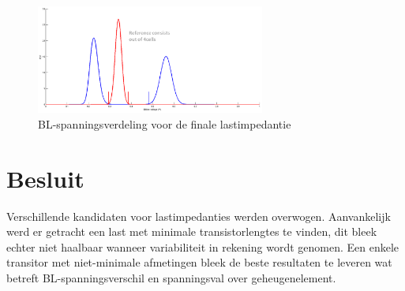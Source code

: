 \begin{figure}[!ht]
  \centering
  \includegraphics[width=0.67\textwidth]{../fig/hfdst-last-var2.png}
  \caption{BL-spanningsverdeling voor de finale lastimpedantie}
  \label{fig:distswitch}
\end{figure}

\section{Besluit}
Verschillende kandidaten voor lastimpedanties werden overwogen. Aanvankelijk werd er getracht een last met minimale transistorlengtes te vinden, dit bleek echter niet haalbaar wanneer variabiliteit in rekening wordt genomen. Een enkele transitor met niet-minimale afmetingen bleek de beste resultaten te leveren wat betreft BL-spanningsverschil en spanningsval over geheugenelement.